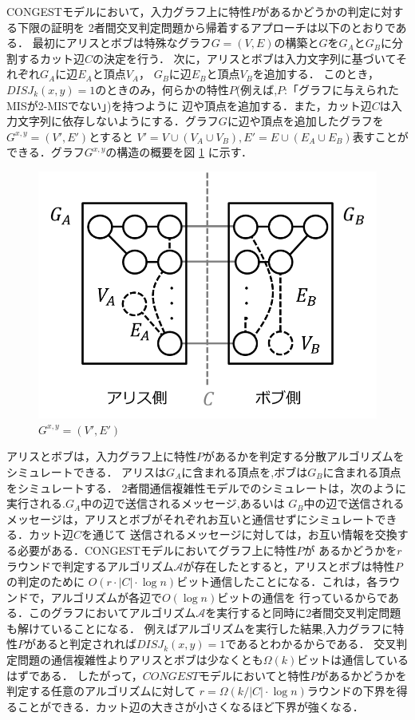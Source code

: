 \documentclass[12pt]{thesis}
\newcommand{\CONGEST}{\textsf{CONGEST}}
\theoremstyle{definition}
\begin{document}
{\CONGEST}モデルにおいて，入力グラフ上に特性$P$があるかどうかの判定に対する下限の証明を
2者間交叉判定問題から帰着するアプローチは以下のとおりである．
最初にアリスとボブは特殊なグラフ$G = (V, E)$の構築と$G$を$G_{A}$と$G_{B}$に分割するカット辺$C$の決定を行う．
次に，アリスとボブは入力文字列に基づいてそれぞれ$G_{A}$に辺$E_{A}$と頂点$V_{A}$，
$G_{B}$に辺$E_{B}$と頂点$V_{B}$を追加する．
このとき，$DISJ_{k} (x, y)=1$のときのみ，何らかの特性$P$(例えば,$P$:「グラフに与えられたMISが2-MISでない」)を持つように
辺や頂点を追加する．また，カット辺$C$は入力文字列に依存しないようにする．グラフ$G$に辺や頂点を追加したグラフを
$G^{x, y} = (V', E')$とすると
$V' = V \cup (V_{A} \cup V_{B}), E' = E \cup (E_{A} \cup E_{B})$表すことができる．グラフ$G^{x, y}$の構造の概要を図 \ref{Gxy} に示す．

\begin{figure}[ht]
\begin{center}
\includegraphics[width=120mm]{Gxy.png}
\end{center}
\caption{$G^{x, y} = (V', E')$}
\label{Gxy}
\end{figure}

アリスとボブは，入力グラフ上に特性$P$があるかを判定する分散アルゴリズムをシミュレートできる．
アリスは$G_{A}$に含まれる頂点を,ボブは$G_{B}$に含まれる頂点をシミュレートする．
2者間通信複雑性モデルでのシミュレートは，次のように実行される.$G_{A}$中の辺で送信されるメッセージ,あるいは
$G_{B}$中の辺で送信されるメッセージは，アリスとボブがそれぞれお互いと通信せずにシミュレートできる．カット辺$C$を通じて
送信されるメッセージに対しては，お互い情報を交換する必要がある．{\CONGEST}モデルにおいてグラフ上に特性$P$が
あるかどうかを$r$ラウンドで判定するアルゴリズム$\mathcal{A}$が存在したとすると，アリスとボブは特性$P$の判定のために
$O(r \cdot |C| \cdot \log n)$ビット通信したことになる．これは，各ラウンドで，アルゴリズムが各辺で$O(\log n)$ビットの通信を
行っているからである．このグラフにおいてアルゴリズム$\mathcal{A}$を実行すると同時に2者間交叉判定問題も解けていることになる．
例えばアルゴリズムを実行した結果,入力グラフに特性$P$があると判定されれば$DISJ_{k} (x, y)=1$であるとわかるからである．
交叉判定問題の通信複雑性よりアリスとボブは少なくとも$\Omega (k)$ビットは通信しているはずである．
したがって，$CONGEST$モデルにおいてと特性$P$があるかどうかを判定する任意のアルゴリズムに対して
$r = \Omega (k / |C| \cdot \log n)$ラウンドの下界を得ることができる．カット辺の大きさが小さくなるほど下界が強くなる．
\end{document}
